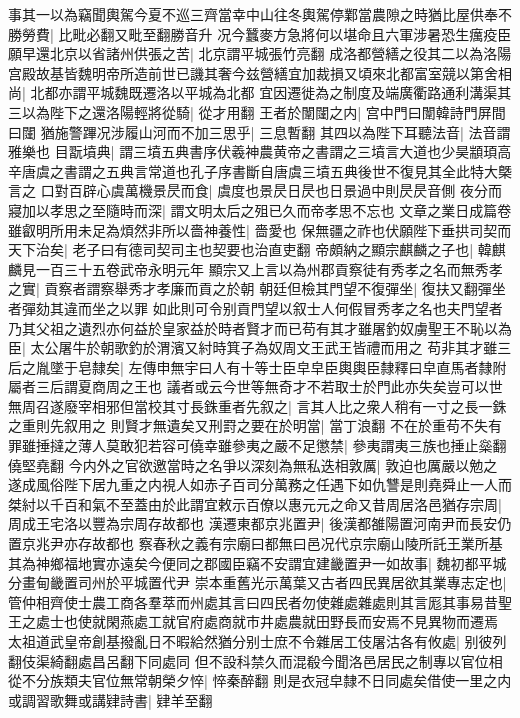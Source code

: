 事其一以為竊聞輿駕今夏不巡三齊當幸中山往冬輿駕停鄴當農隙之時猶比屋供奉不勝勞費|{
	比毗必翻又毗至翻勝音升}
况今蠶麥方急將何以堪命且六軍涉暑恐生癘疫臣願早還北京以省諸州供張之苦|{
	北京謂平城張竹亮翻}
成洛都營繕之役其二以為洛陽宫殿故基皆魏明帝所造前世已譏其奢今兹營繕宜加裁損又頃來北都富室競以第舍相尚|{
	北都亦謂平城魏既遷洛以平城為北都}
宜因遷徙為之制度及端廣衢路通利溝渠其三以為陛下之還洛陽輕將從騎|{
	從才用翻}
王者於闈闥之内|{
	宫中門曰闈韓詩門屏間曰闥}
猶施警蹕况涉履山河而不加三思乎|{
	三息暫翻}
其四以為陛下耳聽法音|{
	法音謂雅樂也}
目翫墳典|{
	謂三墳五典書序伏羲神農黄帝之書謂之三墳言大道也少昊顓頊高辛唐虞之書謂之五典言常道也孔子序書斷自唐虞三墳五典後世不復見其全此特大槩言之}
口對百辟心虞萬機景昃而食|{
	虞度也景昃日昃也日景過中則昃昃音側}
夜分而寢加以孝思之至隨時而深|{
	謂文明太后之殂已久而帝孝思不忘也}
文章之業日成篇卷雖叡明所用未足為煩然非所以嗇神養性|{
	嗇愛也}
保無疆之祚也伏願陛下垂拱司契而天下治矣|{
	老子曰有德司契司主也契要也治直吏翻}
帝頗納之顯宗麒麟之子也|{
	韓麒麟見一百三十五卷武帝永明元年}
顯宗又上言以為州郡貢察徒有秀孝之名而無秀孝之實|{
	貢察者謂察舉秀才孝廉而貢之於朝}
朝廷但檢其門望不復彈坐|{
	復扶又翻彈坐者彈劾其違而坐之以罪}
如此則可令别貢門望以叙士人何假冒秀孝之名也夫門望者乃其父祖之遺烈亦何益於皇家益於時者賢才而已苟有其才雖屠釣奴虜聖王不恥以為臣|{
	太公屠牛於朝歌釣於渭濱又紂時箕子為奴周文王武王皆禮而用之}
苟非其才雖三后之胤墜于皂隸矣|{
	左傳申無宇曰人有十等士臣皁皁臣輿輿臣隸釋曰皁直馬者隸附屬者三后謂夏商周之王也}
議者或云今世等無奇才不若取士於門此亦失矣豈可以世無周召遂廢宰相邪但當校其寸長銖重者先叙之|{
	言其人比之衆人稍有一寸之長一銖之重則先叙用之}
則賢才無遺矣又刑罸之要在於明當|{
	當丁浪翻}
不在於重苟不失有罪雖捶撻之薄人莫敢犯若容可僥幸雖參夷之嚴不足懲禁|{
	參夷謂夷三族也捶止橤翻僥堅堯翻}
今内外之官欲邀當時之名爭以深刻為無私迭相敦厲|{
	敦迫也厲嚴以勉之}
遂成風俗陛下居九重之内視人如赤子百司分萬務之任遇下如仇讐是則堯舜止一人而桀紂以千百和氣不至蓋由於此謂宜敕示百僚以惠元元之命又昔周居洛邑猶存宗周|{
	周成王宅洛以豐為宗周存故都也}
漢遷東都京兆置尹|{
	後漢都雒陽置河南尹而長安仍置京兆尹亦存故都也}
察春秋之義有宗廟曰都無曰邑况代京宗廟山陵所託王業所基其為神鄉福地實亦遠矣今便同之郡國臣竊不安謂宜建畿置尹一如故事|{
	魏初都平城分畫甸畿置司州於平城置代尹}
崇本重舊光示萬葉又古者四民異居欲其業專志定也|{
	管仲相齊使士農工商各羣萃而州處其言曰四民者勿使雜處雜處則其言厖其事易昔聖王之處士也使就閑燕處工就官府處商就市井處農就田野長而安焉不見異物而遷焉}
太祖道武皇帝創基撥亂日不暇給然猶分别士庶不令雜居工伎屠沽各有攸處|{
	别彼列翻伎渠綺翻處昌呂翻下同處同}
但不設科禁久而混殽今聞洛邑居民之制專以官位相從不分族類夫官位無常朝榮夕悴|{
	悴秦醉翻}
則是衣冠皁隸不日同處矣借使一里之内或調習歌舞或講肄詩書|{
	肄羊至翻}
